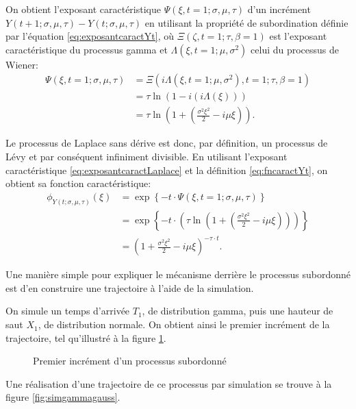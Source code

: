 On obtient l'exposant caractéristique $\Psi(\xi,t=1;\sigma,\mu,\tau)$
d'un incrément $Y(t+1;\sigma,\mu,\tau)-Y(t;\sigma,\mu,\tau)$ en
utilisant la propriété de subordination définie par l'équation
\eqref{eq:exposantcaractYt}, où $\Xi(\zeta,t=1;\tau,\beta=1)$ est
l'exposant caractéristique du processus gamma et
$\Lambda(\xi,t=1;\mu,\sigma^2)$ celui du processus de Wiener:
\begin{align}
  \label{eq:exposantcaractLaplace}
  \Psi(\xi,t=1;\sigma,\mu,\tau) &= \Xi(i\Lambda(\xi,t=1;\mu,\sigma^2),t=1;\tau,\beta=1) \nonumber\\
  &= \tau \ln{\left(1-i(i\Lambda(\xi)) \right)} \nonumber\\
  &= \tau \ln{\left(1+(\frac{\sigma^2 \xi^2}{2} - i \mu \xi) \right)}.
\end{align}

Le processus de Laplace sans dérive est donc, par définition, un
processus de Lévy et par conséquent infiniment divisible. En utilisant
l'exposant caractéristique \eqref{eq:exposantcaractLaplace} et la
définition \eqref{eq:fncaractYt}, on obtient sa fonction
caractéristique:
\begin{align}
  \label{eq:fonctioncaractlaplacesansdrift}
  \phi_{Y(t;\sigma,\mu,\tau)}(\xi) &= \exp{\left\{-t \cdot \Psi(\xi,t=1;\sigma,\mu,\tau)\right\}} \nonumber\\
  &= \exp{\left\{-t \cdot \left(\tau \ln{\left(1+(\frac{\sigma^2
              \xi^2}{2} - i \mu
            \xi) \right)} \right)\right\}} \nonumber\\
  &= \left(1+\frac{\sigma^2 \xi^2}{2} - i \mu \xi\right)^{-\tau \cdot
    t}.
\end{align}

Une manière simple pour expliquer le mécanisme derrière le processus
subordonné est d'en construire une trajectoire à l'aide de la
simulation.

On simule un temps d'arrivée $T_1$, de distribution gamma, puis une
hauteur de saut $X_1$, de distribution normale. On obtient ainsi le
premier incrément de la trajectoire, tel qu'illustré à la figure
\ref{fig:increment1}.
\begin{figure}[!ht]
  \centering 
  \caption{Premier incrément d'un processus subordonné}
  \label{fig:increment1}
\end{figure}

Une réalisation d'une trajectoire de ce processus par simulation se
trouve à la figure \ref{fig:simgammagauss}.


